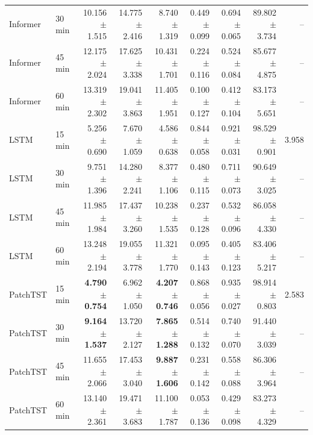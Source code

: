 \begin{table}[!t]
{\begin{tabular}{llrrrrrrr}
Informer & 30 min & 10.156 $\pm$ 1.515 & 14.775 $\pm$ 2.416 & 8.740 $\pm$ 1.319 & 0.449 $\pm$ 0.099 & 0.694 $\pm$ 0.065 & 89.802 $\pm$ 3.734 & -- \\
Informer & 45 min & 12.175 $\pm$ 2.024 & 17.625 $\pm$ 3.338 & 10.431 $\pm$ 1.701 & 0.224 $\pm$ 0.116 & 0.524 $\pm$ 0.084 & 85.677 $\pm$ 4.875 & -- \\
Informer & 60 min & 13.319 $\pm$ 2.302 & 19.041 $\pm$ 3.863 & 11.405 $\pm$ 1.951 & 0.100 $\pm$ 0.127 & 0.412 $\pm$ 0.104 & 83.173 $\pm$ 5.651 & -- \\
\midrule
LSTM & 15 min & 5.256 $\pm$ 0.690 & 7.670 $\pm$ 1.059 & 4.586 $\pm$ 0.638 & 0.844 $\pm$ 0.058 & 0.921 $\pm$ 0.031 & 98.529 $\pm$ 0.901 & 3.958 \\
LSTM & 30 min & 9.751 $\pm$ 1.396 & 14.280 $\pm$ 2.241 & 8.377 $\pm$ 1.106 & 0.480 $\pm$ 0.115 & 0.711 $\pm$ 0.073 & 90.649 $\pm$ 3.025 & -- \\
LSTM & 45 min & 11.985 $\pm$ 1.984 & 17.437 $\pm$ 3.260 & 10.238 $\pm$ 1.535 & 0.237 $\pm$ 0.128 & 0.532 $\pm$ 0.096 & 86.058 $\pm$ 4.330 & -- \\
LSTM & 60 min & 13.248 $\pm$ 2.194 & 19.055 $\pm$ 3.778 & 11.321 $\pm$ 1.770 & 0.095 $\pm$ 0.143 & 0.405 $\pm$ 0.123 & 83.406 $\pm$ 5.217 & -- \\
\midrule
PatchTST & 15 min & \textbf{4.790 $\pm$ 0.754} & 6.962 $\pm$ 1.050 & \textbf{4.207 $\pm$ 0.746} & 0.868 $\pm$ 0.056 & 0.935 $\pm$ 0.027 & 98.914 $\pm$ 0.803 & 2.583 \\
PatchTST & 30 min & \textbf{9.164 $\pm$ 1.537} & 13.720 $\pm$ 2.127 & \textbf{7.865 $\pm$ 1.288} & 0.514 $\pm$ 0.132 & 0.740 $\pm$ 0.070 & 91.440 $\pm$ 3.039 & -- \\
PatchTST & 45 min & 11.655 $\pm$ 2.066 & 17.453 $\pm$ 3.040 & \textbf{9.887 $\pm$ 1.606} & 0.231 $\pm$ 0.142 & 0.558 $\pm$ 0.088 & 86.306 $\pm$ 3.964 & -- \\
PatchTST & 60 min & 13.140 $\pm$ 2.361 & 19.471 $\pm$ 3.683 & 11.100 $\pm$ 1.787 & 0.053 $\pm$ 0.136 & 0.429 $\pm$ 0.098 & 83.273 $\pm$ 4.329 & -- \\
\bottomrule
\end{tabular}%
}
\end{table}
